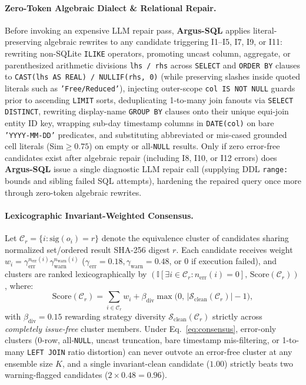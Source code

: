 \documentclass[10pt,twocolumn]{article}
\begin{document}
\paragraph{Zero-Token Algebraic Dialect \& Relational Repair.}
Before invoking an expensive LLM repair pass, \textbf{Argus-SQL} applies literal-preserving algebraic rewrites to any candidate triggering I1--I5, I7, I9, or I11: rewriting non-SQLite \texttt{ILIKE} operators, promoting uncast column, aggregate, or parenthesized arithmetic divisions \texttt{lhs / rhs} across \texttt{SELECT} and \texttt{ORDER BY} clauses to \texttt{CAST(lhs AS REAL) / NULLIF(rhs, 0)} (while preserving slashes inside quoted literals such as \texttt{'Free/Reduced'}), injecting outer-scope \texttt{col IS NOT NULL} guards prior to ascending \texttt{LIMIT} sorts, deduplicating 1-to-many join fanouts via \texttt{SELECT DISTINCT}, rewriting display-name \texttt{GROUP BY} clauses onto their unique equi-join entity ID key, wrapping sub-day timestamp columns in \texttt{DATE(col)} on bare \texttt{'YYYY-MM-DD'} predicates, and substituting abbreviated or mis-cased grounded cell literals ($\text{Sim} \ge 0.75$) on empty or all-\texttt{NULL} results. Only if zero error-free candidates exist after algebraic repair (including I8, I10, or I12 errors) does \textbf{Argus-SQL} issue a single diagnostic LLM repair call (supplying DDL \texttt{range:} bounds and sibling failed SQL attempts), hardening the repaired query once more through zero-token algebraic rewrites.

\paragraph{Lexicographic Invariant-Weighted Consensus.}
Let $\mathcal{C}_r = \{i : \text{sig}(o_i) = r\}$ denote the equivalence cluster of candidates sharing normalized set/ordered result SHA-256 digest $r$. Each candidate receives weight $w_i = \gamma_{\text{err}}^{n_{\text{err}}(i)} \gamma_{\text{warn}}^{n_{\text{warn}}(i)}$ ($\gamma_{\text{err}}=0.18, \gamma_{\text{warn}}=0.48$, or $0$ if execution failed), and clusters are ranked lexicographically by $(\mathbb{I}[\exists i \in \mathcal{C}_r : n_{\text{err}}(i)=0], \, \text{Score}(\mathcal{C}_r))$, where:
\begin{equation}
  \text{Score}(\mathcal{C}_r) = \!\sum_{i \in \mathcal{C}_r}\! w_i + \beta_{\text{div}} \max\!\big(0,\, |\mathcal{S}_{\text{clean}}(\mathcal{C}_r)| - 1\big),
  \label{eq:consensus}
\end{equation}
with $\beta_{\text{div}} = 0.15$ rewarding strategy diversity $\mathcal{S}_{\text{clean}}(\mathcal{C}_r)$ strictly across \emph{completely issue-free} cluster members. Under Eq.~\eqref{eq:consensus}, error-only clusters ($0$-row, all-\texttt{NULL}, uncast truncation, bare timestamp mis-filtering, or 1-to-many \texttt{LEFT JOIN} ratio distortion) can never outvote an error-free cluster at any ensemble size $K$, and a single invariant-clean candidate ($1.00$) strictly beats two warning-flagged candidates ($2 \times 0.48 = 0.96$).
\end{document}
